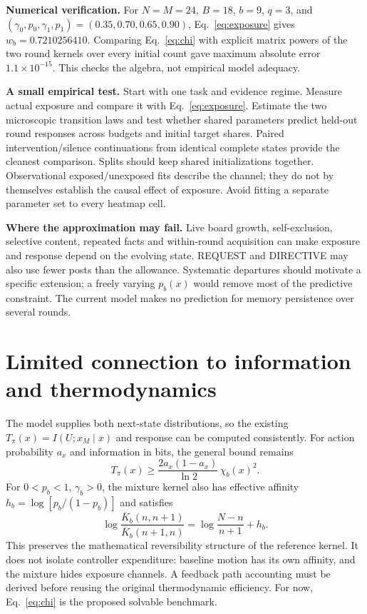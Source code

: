 \documentclass[11pt,a4paper]{article}
\begin{document}
\textbf{Numerical verification.} For $N=M=24$, $B=18$, $b=9$, $q=3$, and $(\gamma_0,p_0,\gamma_1,p_1)=(0.35,0.70,0.65,0.90)$, Eq.~\eqref{eq:exposure} gives $w_b=0.7210256410$. Comparing Eq.~\eqref{eq:chi} with explicit matrix powers of the two round kernels over every initial count gave maximum absolute error $1.1\times10^{-15}$. This checks the algebra, not empirical model adequacy.

\textbf{A small empirical test.} Start with one task and evidence regime. Measure actual exposure and compare it with Eq.~\eqref{eq:exposure}. Estimate the two microscopic transition laws and test whether shared parameters predict held-out round responses across budgets and initial target shares. Paired intervention/silence continuations from identical complete states provide the cleanest comparison. Splits should keep shared initializations together. Observational exposed/unexposed fits describe the channel; they do not by themselves establish the causal effect of exposure. Avoid fitting a separate parameter set to every heatmap cell.

\textbf{Where the approximation may fail.} Live board growth, self-exclusion, selective content, repeated facts and within-round acquisition can make exposure and response depend on the evolving state. REQUEST and DIRECTIVE may also use fewer posts than the allowance. Systematic departures should motivate a specific extension; a freely varying $p_b(x)$ would remove most of the predictive constraint. The current model makes no prediction for memory persistence over several rounds.

\section{Limited connection to information and thermodynamics}
The model supplies both next-state distributions, so the existing $T_\pi(x)=I(U;x_M\mid x)$ and response can be computed consistently. For action probability $a_x$ and information in bits, the general bound remains
\begin{equation}
 T_\pi(x)\geq \frac{2a_x(1-a_x)}{\ln 2}\,\chi_b(x)^2.
\end{equation}
For $0<p_b<1$, $\gamma_b>0$, the mixture kernel also has effective affinity $h_b=\log[p_b/(1-p_b)]$ and satisfies
\begin{equation}
 \log\frac{\overline K_b(n,n+1)}{\overline K_b(n+1,n)}
 =\log\frac{N-n}{n+1}+h_b.
\end{equation}
This preserves the mathematical reversibility structure of the reference kernel. It does not isolate controller expenditure: baseline motion has its own affinity, and the mixture hides exposure channels. A feedback path accounting must be derived before reusing the original thermodynamic efficiency. For now, Eq.~\eqref{eq:chi} is the proposed solvable benchmark.
\end{document}
